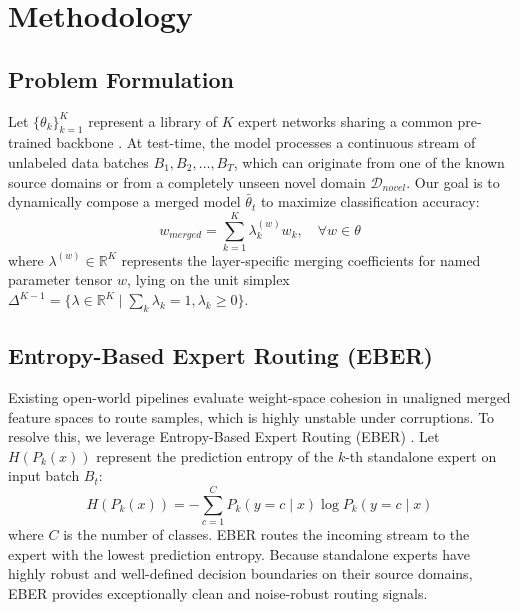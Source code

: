 \documentclass{article}
\begin{document}
\section{Methodology}
\label{sec:method}

\subsection{Problem Formulation}
Let $\{ \theta_k \}_{k=1}^K$ represent a library of $K$ expert networks sharing a common pre-trained backbone \cite{he2016deep}. At test-time, the model processes a continuous stream of unlabeled data batches $B_1, B_2, \ldots, B_T$, which can originate from one of the known source domains or from a completely unseen novel domain $\mathcal{D}_{novel}$. Our goal is to dynamically compose a merged model $\bar{\theta}_t$ to maximize classification accuracy:
\begin{equation}
w_{merged} = \sum_{k=1}^K \lambda^{(w)}_k w_k, \quad \forall w \in \theta
\end{equation}
where $\lambda^{(w)} \in \mathbb{R}^K$ represents the layer-specific merging coefficients for named parameter tensor $w$, lying on the unit simplex $\Delta^{K-1} = \{ \lambda \in \mathbb{R}^K \mid \sum_k \lambda_k = 1, \lambda_k \geq 0 \}$.

\subsection{Entropy-Based Expert Routing (EBER)}
Existing open-world pipelines evaluate weight-space cohesion in unaligned merged feature spaces to route samples, which is highly unstable under corruptions. To resolve this, we leverage Entropy-Based Expert Routing (EBER) \cite{zhao2026drfisher}. Let $H(P_k(x))$ represent the prediction entropy of the $k$-th standalone expert on input batch $B_t$:
\begin{equation}
H(P_k(x)) = -\sum_{c=1}^C P_k(y=c \mid x) \log P_k(y=c \mid x)
\end{equation}
where $C$ is the number of classes. EBER routes the incoming stream to the expert with the lowest prediction entropy. Because standalone experts have highly robust and well-defined decision boundaries on their source domains, EBER provides exceptionally clean and noise-robust routing signals.
\end{document}
